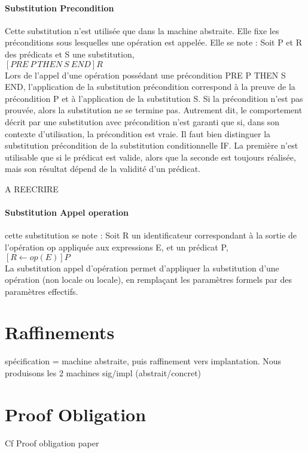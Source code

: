 \paragraph{Substitution Precondition}
Cette substitution n'est utilisée que dans la machine abstraite. Elle fixe les
préconditions sous lesquelles une opération est appelée. Elle se note : Soit P
et R des prédicats et S une substitution,\\ 
$[PRE~ P~ THEN~ S~ END]R$\\
Lors   de   l’appel   d’une   opération   possédant   une   précondition  PRE P THEN S END, 
l’application de la substitution précondition correspond à la preuve de la précondition  P 
et à  l’application  de la substitution  S. Si la précondition  n’est pas  prouvée, alors  la 
substitution   ne   se   termine   pas.   Autrement   dit,   le   comportement   décrit   par   une 
substitution avec précondition n’est garanti que si, dans son contexte d’utilisation, la 
précondition est vraie.
Il faut bien distinguer la substitution précondition de la substitution conditionnelle  IF. 
La   première   n’est   utilisable   que   si   le   prédicat   est   valide,   alors   que   la   seconde   est 
toujours réalisée, mais son résultat dépend de la validité d’un prédicat.

A REECRIRE

\paragraph{Substitution Appel operation}
cette substitution se note : Soit R un identificateur correspondant à la sortie
de l'opération op appliquée aux expressions E, et un prédicat P,\\
$[R\leftarrow op(E)]P$\\
La  substitution  appel   d’opération  permet  d’appliquer  la  substitution   d’une opération 
(non   locale   ou   locale),   en   remplaçant   les   paramètres   formels   par   des   paramètres 
effectifs.




\section{Raffinements}
spécification = machine abstraite, puis raffinement vers
implantation.
Nous produisons les 2 machines sig/impl (abstrait/concret)


\section{Proof Obligation}
Cf Proof obligation paper

